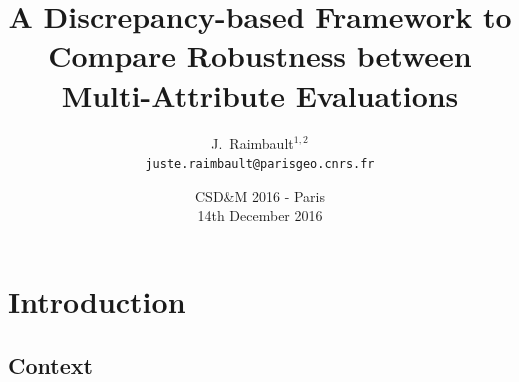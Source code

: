 \documentclass[english,11pt]{beamer}
\begin{document}
\title{A Discrepancy-based Framework to Compare Robustness between Multi-Attribute Evaluations}

\author{J.~Raimbault$^{1,2}$\\
\texttt{juste.raimbault@parisgeo.cnrs.fr}
}




\date{CSD{\&}M 2016 - Paris\\\smallskip
14th December 2016
}

\frame{\maketitle}







\section{Introduction}

\subsection{Context}
\end{document}
